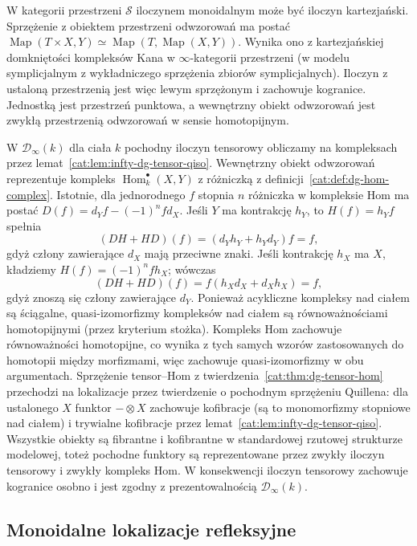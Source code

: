 \begin{przyklad}\label{cat:ex:infty-presentable-monoidal-closed}
W kategorii przestrzeni $\mathcal S$ iloczynem monoidalnym może być iloczyn kartezjański. Sprzężenie z obiektem przestrzeni odwzorowań ma postać $\operatorname{Map}(T\times X,Y)\simeq\operatorname{Map}(T,\operatorname{Map}(X,Y))$. Wynika ono z kartezjańskiej domkniętości kompleksów Kana w $\infty$-kategorii przestrzeni (w modelu symplicjalnym z wykładniczego sprzężenia zbiorów symplicjalnych). Iloczyn z ustaloną przestrzenią jest więc lewym sprzężonym i zachowuje kogranice. Jednostką jest przestrzeń punktowa, a wewnętrzny obiekt odwzorowań jest zwykłą przestrzenią odwzorowań w sensie homotopijnym.

W $\mathcal D_\infty(k)$ dla ciała $k$ pochodny iloczyn tensorowy obliczamy na kompleksach przez lemat~\ref{cat:lem:infty-dg-tensor-qiso}. Wewnętrzny obiekt odwzorowań reprezentuje kompleks $\operatorname{Hom}^\bullet_k(X,Y)$ z różniczką z definicji~\ref{cat:def:dg-hom-complex}. Istotnie, dla jednorodnego $f$ stopnia $n$ różniczka w kompleksie Hom ma postać $D(f)=d_Y f-(-1)^n f d_X$. Jeśli $Y$ ma kontrakcję $h_Y$, to $H(f)=h_Y f$ spełnia
\[
 (DH+HD)(f)=(d_Yh_Y+h_Yd_Y)f=f,
\]
gdyż człony zawierające $d_X$ mają przeciwne znaki. Jeśli kontrakcję $h_X$ ma $X$, kładziemy $H(f)=(-1)^n f h_X$; wówczas
\[
 (DH+HD)(f)=f(h_Xd_X+d_Xh_X)=f,
\]
gdyż znoszą się człony zawierające $d_Y$. Ponieważ acykliczne kompleksy nad ciałem są ściągalne, quasi-izomorfizmy kompleksów nad ciałem są równoważnościami homotopijnymi (przez kryterium stożka). Kompleks Hom zachowuje równoważności homotopijne, co wynika z tych samych wzorów zastosowanych do homotopii między morfizmami, więc zachowuje quasi-izomorfizmy w obu argumentach. Sprzężenie tensor--Hom z twierdzenia~\ref{cat:thm:dg-tensor-hom} przechodzi na lokalizacje przez twierdzenie o pochodnym sprzężeniu Quillena: dla ustalonego $X$ funktor $-\otimes X$ zachowuje kofibracje (są to monomorfizmy stopniowe nad ciałem) i trywialne kofibracje przez lemat~\ref{cat:lem:infty-dg-tensor-qiso}. Wszystkie obiekty są fibrantne i kofibrantne w standardowej rzutowej strukturze modelowej, toteż pochodne funktory są reprezentowane przez zwykły iloczyn tensorowy i zwykły kompleks Hom. W konsekwencji iloczyn tensorowy zachowuje kogranice osobno i jest zgodny z prezentowalnością $\mathcal D_\infty(k)$.
\end{przyklad}

\subsection{Monoidalne lokalizacje refleksyjne}

